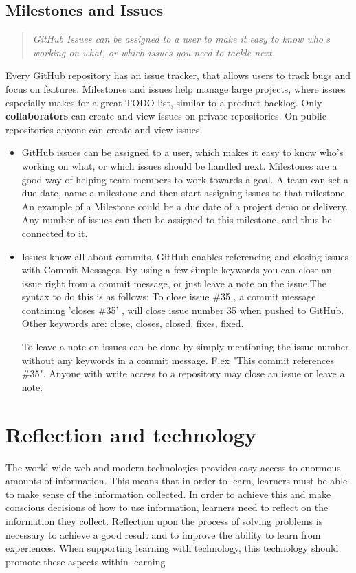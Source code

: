 \subsection{Milestones and Issues}
\begin{quote}
\em GitHub Issues can be assigned to a user to make it easy to know who's working on what, or which issues you need to tackle next.
\end{quote}
Every GitHub repository has an issue tracker, that allows users to track bugs and focus on features. Milestones and issues help manage large projects, where issues especially makes for a great TODO list, similar to a product backlog. Only {\bf collaborators} can create and view issues on private repositories. On public repositories anyone can create and view issues. 
\begin{itemize}
\item GitHub issues can be assigned to a user, which makes it easy to know who's working on what, or which issues should be handled next. Milestones are a good way of helping team members to work towards a goal. A team can set a due date, name a milestone and then start assigning issues to that milestone. An example of a Milestone could be a due date of a project demo or delivery. Any number of issues can then be assigned to this milestone, and thus be connected to it. 
\item Issues know all about commits. GitHub enables referencing and closing issues with Commit Messages. By using a few simple keywords you can close an issue right from a commit message, or just leave a note on the issue.The syntax to do this is as follows: To close issue \#35 , a commit message containing 'closes \#35' , will close issue number 35 when pushed to GitHub. Other keywords are: close, closes, closed, fixes, fixed. 

To leave a note on issues can be done by simply mentioning the issue number without any keywords in a commit message. F.ex "This commit references \#35". Anyone with write access to a repository may close an issue or leave a note.
\end{itemize}

\section{Reflection and technology}
The world wide web and modern technologies provides easy access to enormous amounts of information. This means that in order to learn, learners must be able to make sense of the information collected.  
In order to achieve this and make conscious decisions of how to use information, learners need to reflect on the information they collect. Reflection upon the process of solving problems is necessary to achieve a good result and to improve the ability to learn from experiences. When supporting learning with technology, this technology should promote these aspects within learning\citep{Lin1999}

